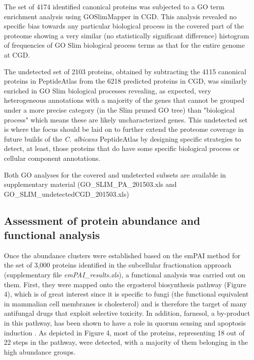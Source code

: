 The set of 4174 identified canonical proteins was subjected to a GO term enrichment
analysis using GOSlimMapper in CGD. This analysis revealed no specific bias towards any
particular biological process in the covered part of the proteome showing a very similar (no
statistically significant difference) histogram of frequencies of GO Slim biological process
terms as that for the entire genome at CGD.

The undetected set of 2103 proteins, obtained by subtracting the 4115 canonical proteins in
PeptideAtlas from the 6218 predicted proteins in CGD, was similarly enriched in GO Slim
biological processes revealing, as expected, very heterogeneous annotations with a majority
of the genes that cannot be grouped under a more precise category (in the Slim pruned GO
tree) than "biological process" which means these are likely uncharacterized genes. This
undetected set is where the focus should be laid on to further extend the proteome coverage
in future builds of the \textit{C. albicans} PeptideAtlas by designing specific strategies to detect, at
least, those proteins that do have some specific biological process or cellular component
annotations.

Both GO analyses for the covered and undetected subsets are available in supplementary
material (GO\_SLIM\_PA\_201503.xls and GO\_SLIM\_undetectedCGD\_201503.xls)



\subsection*{Assessment of protein abundance and functional analysis}

Once the abundance clusters were established based on the emPAI method for the set of
3,000 proteins identified in the subcellular fractionation approach (supplementary file
\textit{emPAI\_results.xls}), a functional analysis was carried out on them. First, they were mapped
onto the ergosterol biosynthesis pathway (Figure 4), which is of great interest since it is
specific to fungi (the functional equivalent in mammalian cell membranes is cholesterol) and
is therefore the target of many antifungal drugs that exploit selective toxicity. In addition,
farnesol, a by-product in this pathway, has been shown to have a role in quorum sensing \citep{Albuquerque2012}
and apoptosis induction \citep{Leger2015}. As depicted in Figure 4, most of the proteins, representing 18
out of 22 steps in the pathway, were detected, with a majority of them belonging in the high
abundance groups.






